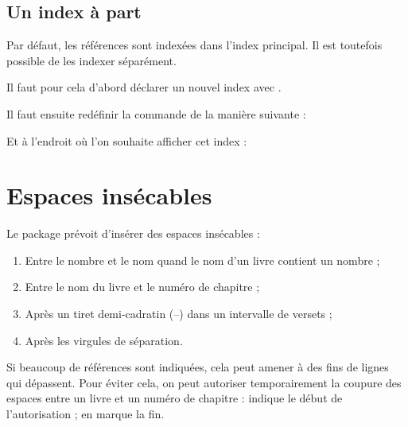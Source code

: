 \subsection{Un index à part}

Par défaut, les références sont indexées dans l'index principal. Il est toutefois possible  de les indexer séparément.

Il faut pour cela d'abord déclarer un nouvel index avec .

\begin{latexcode}
\end{latexcode}

Il faut ensuite redéfinir la commande  de la manière suivante :

\begin{latexcode}
\renewcommand{\biblerefindex}[0]{\index[bible]}
\end{latexcode}

Et à l'endroit où l'on souhaite afficher cet index :

\begin{latexcode}
\printindex[bible]
\end{latexcode}

\section{Espaces insécables}

Le package  prévoit d'insérer des espaces insécables :
\begin{enumerate}
\item Entre le nombre et le nom quand le nom d’un livre contient un nombre ;
\item Entre le nom du livre et le numéro de chapitre ;
\item Après un tiret demi-cadratin (–) dans un intervalle de versets ; 
\item Après les virgules de séparation.
\end{enumerate}

Si beaucoup de références sont indiquées, cela peut amener à des fins de lignes qui dépassent.
Pour éviter cela, on peut autoriser temporairement la coupure des espaces entre un livre et un numéro de chapitre :  indique le début de l'autorisation ;  en marque la fin.


